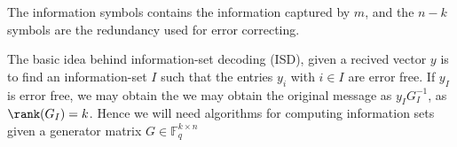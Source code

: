 The information symbols contains the information captured by $m$, and the $n-k$ symbols are the redundancy used for error correcting.

The basic idea behind information-set decoding (ISD), given a recived vector $y$ is to find an information-set $I$ such that the entries $y_i$ with $i \in I$ are error free. If $y_I$ is error free, we may obtain the we may obtain the original message as $y_IG^{-1}_I$, as $\rank(G_I) = k$. Hence we will need algorithms for computing information sets given a generator matrix $G \in \mathbb{F}_q^{k \times n}$




